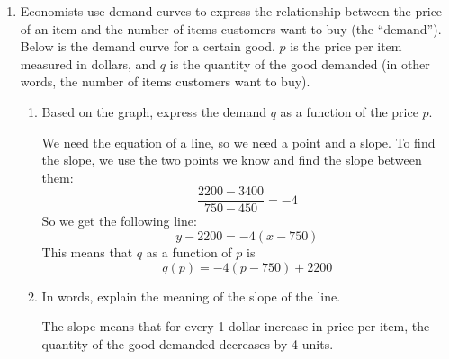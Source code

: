 \documentclass{article}
\begin{document}
\begin{enumerate}
\item  Economists use demand curves to express the relationship between the price of an item and the number of items customers want to buy (the ``demand''). Below is the demand curve for a certain good. $p$ is the price per item measured in dollars, and $q$ is the quantity of the good demanded (in other words, the number of items customers want to buy). 

  \begin{enumerate}
  \item


    \begin{problem}[0.75in]
      Based on the graph, express the demand $q$ as a function of the price $p$.

    \end{problem}

    \begin{solution}
      We need the equation of a line, so we need a
      point and a slope. To find the slope, we use the two points we
      know and find the slope between them:
      $$\frac{2200 - 3400}{750 - 450} = -4$$
      So we get the following line:
      $$y - 2200 = -4(x-750)$$
      This means that $q$ as a function of $p$ is
      \[q(p) = -4(p-750)+2200\]
    \end{solution}

  \item
    \begin{problem}[\stretch{0.5}]
      In words, explain the meaning of the slope of the line.
    \end{problem}

    \begin{solution}
      The slope means that for every 1 dollar increase in
      price per item, the quantity of the good demanded decreases by 4
      units. 
    \end{solution}


\end{enumerate}
\end{enumerate}
\end{document}
